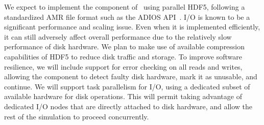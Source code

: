 \documentclass[11pt,letterpaper]{article}
\begin{document}

%
We expect to implement the  component of \cello\ using
parallel HDF5, following a standardized AMR file format such as the
ADIOS API~\cite{LoKl08}.  I/O is known to be a significant performance
and scaling issue.  Even when it is implemented efficiently, it can
still adversely affect overall performance due to the relatively slow
performance of disk hardware.  We plan to make use of available
compression capabilities of HDF5 to reduce disk traffic and storage.
To improve software resilience, we will include support for error
checking on all reads and writes, allowing the  component
to detect faulty disk hardware, mark it as unusable, and continue.  We
will support task parallelism for I/O, using a dedicated subset of
available hardware for disk operations.  This will permit taking
advantage of dedicated I/O nodes that are directly attached to disk
hardware, and allow the rest of the simulation to proceed
concurrently.
\end{document}

